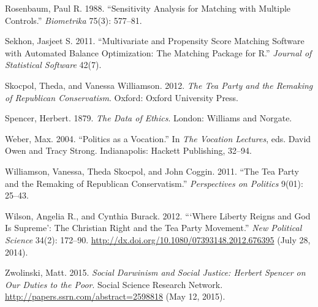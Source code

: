 \documentclass[12pt,]{article}
\begin{document}
Rosenbaum, Paul R. 1988. ``Sensitivity Analysis for Matching with
Multiple Controls.'' \emph{Biometrika} 75(3): 577--81.

Sekhon, Jasjeet S. 2011. ``Multivariate and Propensity Score Matching
Software with Automated Balance Optimization: The Matching Package for
R.'' \emph{Journal of Statistical Software} 42(7).

Skocpol, Theda, and Vanessa Williamson. 2012. \emph{The Tea Party and
the Remaking of Republican Conservatism}. Oxford: Oxford University
Press.

Spencer, Herbert. 1879. \emph{The Data of Ethics}. London: Williams and
Norgate.

Weber, Max. 2004. ``Politics as a Vocation.'' In \emph{The Vocation
Lectures}, eds. David Owen and Tracy Strong. Indianapolis: Hackett
Publishing, 32--94.

Williamson, Vanessa, Theda Skocpol, and John Coggin. 2011. ``The Tea
Party and the Remaking of Republican Conservatism.'' \emph{Perspectives
on Politics} 9(01): 25--43.

Wilson, Angelia R., and Cynthia Burack. 2012. ```Where Liberty Reigns
and God Is Supreme': The Christian Right and the Tea Party Movement.''
\emph{New Political Science} 34(2): 172--90.
\url{http://dx.doi.org/10.1080/07393148.2012.676395} (July 28, 2014).

Zwolinski, Matt. 2015. \emph{Social Darwinism and Social Justice:
Herbert Spencer on Our Duties to the Poor}. Social Science Research
Network. \url{http://papers.ssrn.com/abstract=2598818} (May 12, 2015).
\end{document}
